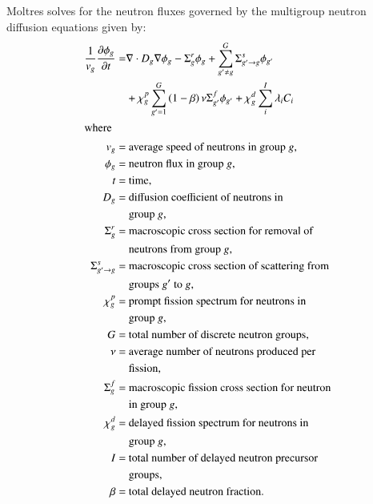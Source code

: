 Moltres solves for the neutron fluxes governed by
the multigroup neutron diffusion equations given by:
%
\begin{align}
    \frac{1}{v_g} \frac{\partial \phi_g}{\partial t} =& \nabla \cdot D_g
    \nabla \phi_g - \Sigma^r_g \phi_g +
    \sum^G_{g' \neq g} \Sigma^s_{g' \rightarrow g} \phi_{g'} \nonumber \\
    &+ \chi^p_g \sum^G_{g'=1} \left( 1-\beta \right) \nu \Sigma^f_{g'}
    \phi_{g'} + \chi^d_g \sum^I_i \lambda_i C_i \label{eq:neut} \\
    \shortintertext{where}
    v_g =& \text{ average speed of neutrons in group $g$,} 
    \nonumber \\
    \phi_g =& \text{ neutron flux in group $g$,}
    \nonumber \\
    t =& \text{ time,} \nonumber \\
    D_g =& \text{ diffusion coefficient of neutrons in} \nonumber \\
    &\text{ group $g$,} \nonumber \\
    \Sigma^r_g =& \text{ macroscopic cross section for removal of} \nonumber \\
    &\text{ neutrons from group $g$,} \nonumber \\
    \Sigma^s_{g' \rightarrow g} =& \text{ macroscopic cross section of
    scattering from} \nonumber \\
    &\text{ groups $g'$ to $g$,} \nonumber \\
    \chi^p_g =& \text{ prompt fission spectrum for neutrons in} \nonumber \\
    &\text{ group $g$,} \nonumber \\
    G =& \text{ total number of discrete neutron groups,} \nonumber \\
    \nu =& \text{ average number of neutrons produced per} \nonumber \\
    &\text{ fission,} \nonumber \\
    \Sigma^f_{g} =& \text{ macroscopic fission cross section for neutron}
    \nonumber \\
    &\text{ in group $g$,} \nonumber \\
    \chi^d_g =& \text{ delayed fission spectrum for neutrons in} \nonumber \\
    &\text{ group $g$,} \nonumber \\
    I =& \text{ total number of delayed neutron precursor} \nonumber \\
    &\text{ groups,} \nonumber \\
    \beta =& \text{ total delayed neutron fraction.} \nonumber
\end{align}

